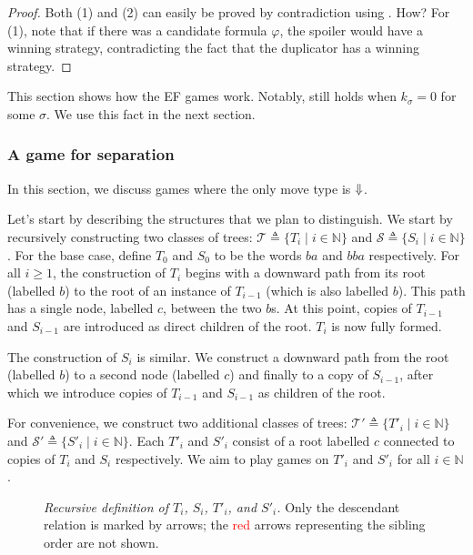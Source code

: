 \documentclass[a4paper,UKenglish,cleveref, autoref, thm-restate, numberwithinsect]{lipics-v2021}
\def\Darrow{\ensuremath\mathord{\Downarrow}}
\begin{document}
\begin{proof}
    Both (1) and (2) can easily be proved by contradiction using . How? For (1), note that if there was a candidate formula $\varphi$, the spoiler would have a winning strategy, contradicting the fact that the duplicator has a winning strategy. %
\end{proof}
This section shows how the EF games work. Notably,  still holds when $k_\sigma = 0$ for some $\sigma$. We use this fact in the next section.

\subsubsection{A game for separation}
\label{sec:game-separation}

In this section, we discuss games where the only move type is $\Darrow$.

Let's start by describing the structures that we plan to distinguish. We start by recursively constructing two classes of trees: $\mathcal{T} \triangleq \{T_i \mid i \in \mathbb{N}\}$ and $\mathcal{S} \triangleq \{S_i \mid i \in \mathbb{N} \}$. For the base case, define $T_0$ and $S_0$ to be the words $ba$ and $bba$ respectively. For all $i \geq 1$, the construction of $T_i$ begins with a downward path from its root (labelled $b$) to the root of an instance of $T_{i - 1}$ (which is also labelled $b$). This path has a single node, labelled $c$, between the two $b$s. At this point, copies of $T_{i - 1}$ and $S_{i - 1}$ are introduced as direct children of the root. $T_i$ is now fully formed.

The construction of $S_i$ is similar. We construct a downward path from the root (labelled $b$) to a second node (labelled $c$) and finally to a copy of $S_{i - 1}$, after which we introduce copies of $T_{i - 1}$ and $S_{i - 1}$ as children of the root.

For convenience, we construct two additional classes of trees: $\mathcal{T}' \triangleq \{T'_i \mid i \in \mathbb{N}\}$ and $\mathcal{S}' \triangleq \{S'_i \mid i \in \mathbb{N} \}$. Each $T'_i$ and $S'_i$ consist of a root labelled $c$ connected to copies of $T_i$ and $S_i$ respectively. We aim to play games on $T'_i$ and $S'_i$ for all $i \in \mathbb{N}$.

\begin{figure}[h]
    \centering
    \caption{\emph{Recursive definition of $T_i$, $S_i$, $T'_i$, and $S'_i$.} Only the descendant relation is marked by arrows; the \textcolor{red}{red} arrows representing the sibling order are not shown.}
    \label{structureinit}
\end{figure}
\end{document}
